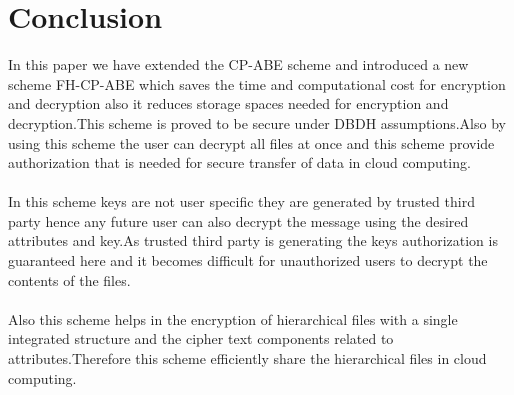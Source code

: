 \documentclass[a4paper,12pt]{article}
\begin{document}
\section{Conclusion}
In this paper we have extended the CP-ABE scheme and introduced a new scheme FH-CP-ABE which saves the time and computational cost for encryption and decryption also it reduces storage spaces needed for encryption and decryption.This scheme is proved to be secure under DBDH assumptions.Also by using this scheme the user can decrypt all files at once and this scheme provide authorization that is needed for secure transfer of data in cloud computing.\\ \\
In this scheme keys are not user specific they are generated by trusted third party hence any future user can also decrypt the message using the desired attributes and key.As trusted third party is generating the keys authorization is guaranteed here and it becomes difficult for unauthorized users to decrypt the contents of the files.\\ \\
Also this scheme helps in the encryption of hierarchical files with a single integrated structure and the cipher text components related to attributes.Therefore this scheme efficiently share the hierarchical files in cloud computing.










\newpage


	
\end{document}
